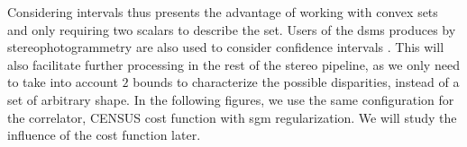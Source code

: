 Considering intervals thus presents the advantage of working with convex sets and only requiring two scalars to describe the set. Users of the \acrshort{dsm}s produces by stereophotogrammetry are also used to consider confidence intervals \cite{oksanen_digital_2006, wang_robust_2015, panagiotakis_validation_2018, deschamps-berger_apport_2021, hugonnet_uncertainty_2022}. This will also facilitate further processing in the rest of the stereo pipeline, as we only need to take into account $2$ bounds to characterize the possible disparities, instead of a set of arbitrary shape. In the following figures, we use the same configuration for the correlator, \ie CENSUS cost function with \acrshort{sgm} regularization. We will study the influence of the cost function later.

